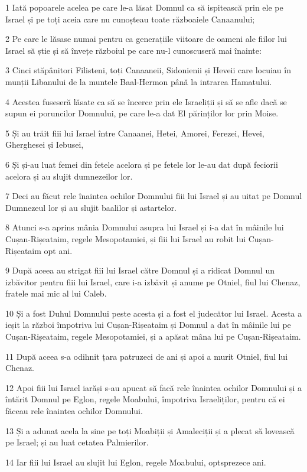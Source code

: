 \par 1 Iată popoarele acelea pe care le-a lăsat Domnul ca să ispitească prin ele pe Israel și pe toți aceia care nu cunoșteau toate războaiele Canaanului;
\par 2 Pe care le lăsase numai pentru ca generațiile viitoare de oameni ale fiilor lui Israel să știe și să învețe războiul pe care nu-l cunoscuseră mai înainte:
\par 3 Cinci stăpânitori Filisteni, toți Canaaneii, Sidonienii și Heveii care locuiau în munții Libanului de la muntele Baal-Hermon până la intrarea Hamatului.
\par 4 Acestea fuseseră lăsate ca să se încerce prin ele Israeliții și să se afle dacă se supun ei poruncilor Domnului, pe care le-a dat El părinților lor prin Moise.
\par 5 Și au trăit fiii lui Israel între Canaanei, Hetei, Amorei, Ferezei, Hevei, Gherghesei și Iebusei,
\par 6 Și și-au luat femei din fetele acelora și pe fetele lor le-au dat după feciorii acelora și au slujit dumnezeilor lor.
\par 7 Deci au făcut rele înaintea ochilor Domnului fiii lui Israel și au uitat pe Domnul Dumnezeul lor și au slujit baalilor și astartelor.
\par 8 Atunci s-a aprins mânia Domnului asupra lui Israel și i-a dat în mâinile lui Cușan-Rișeataim, regele Mesopotamiei, și fiii lui Israel au robit lui Cușan-Rișeataim opt ani.
\par 9 După aceea au strigat fiii lui Israel către Domnul și a ridicat Domnul un izbăvitor pentru fiii lui Israel, care i-a izbăvit și anume pe Otniel, fiul lui Chenaz, fratele mai mic al lui Caleb.
\par 10 Și a fost Duhul Domnului peste acesta și a fost el judecător lui Israel. Acesta a ieșit la război împotriva lui Cușan-Rișeataim și Domnul a dat în mâinile lui pe Cușan-Rișeataim, regele Mesopotamiei, și a apăsat mâna lui pe Cușan-Rișeataim.
\par 11 După aceea s-a odihnit țara patruzeci de ani și apoi a murit Otniel, fiul lui Chenaz.
\par 12 Apoi fiii lui Israel iarăși s-au apucat să facă rele înaintea ochilor Domnului și a întărit Domnul pe Eglon, regele Moabului, împotriva Israeliților, pentru că ei făceau rele înaintea ochilor Domnului.
\par 13 Și a adunat acela la sine pe toți Moabiții și Amaleciții și a plecat să lovească pe Israel; și au luat cetatea Palmierilor.
\par 14 Iar fiii lui Israel au slujit lui Eglon, regele Moabului, optsprezece ani.
